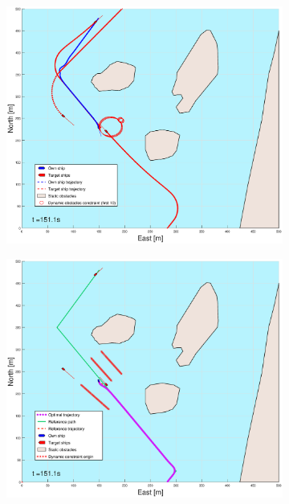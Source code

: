 \begin{figure}[ht]\ContinuedFloat
    \begin{subfigure}[b]{0.494\textwidth}
        \centering
        \includegraphics[width=\textwidth]{Images/Figures/Helloya_Rev/_Simple_1fig1_time=151}
        \subcaption{}
    \end{subfigure}
    \hfill
    \begin{subfigure}[b]{0.494\textwidth}
        \centering
        \includegraphics[width=\textwidth]{Images/Figures/Helloya_Rev/_Simple_1fig999_time=151}

\end{subfigure}
\end{figure}
